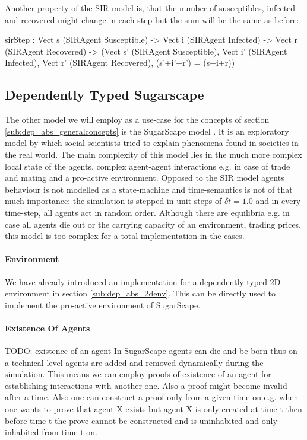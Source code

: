 Another property of the SIR model is, that the number of susceptibles, infected and recovered might change in each step but the sum will be the same as before:
\begin{HaskellCode}
sirStep : Vect s (SIRAgent Susceptible) -> 
          Vect i (SIRAgent Infected) ->
          Vect r (SIRAgent Recovered) -> 
          (Vect s' (SIRAgent Susceptible),
           Vect i' (SIRAgent Infected), 
           Vect r' (SIRAgent Recovered), (s'+i'+r') = (s+i+r))
\end{HaskellCode}
          
\subsection{Dependently Typed Sugarscape}
\label{sub:dep_abs_sugarscape}
The other model we will employ as a use-case for the concepts of section \ref{sub:dep_abs_generalconcepts} is the SugarScape model \cite{epstein_growing_1996}. It is an exploratory model by which social scientists tried to explain phenomena found in societies in the real world. The main complexity of this model lies in the much more complex local state of the agents, complex agent-agent interactions e.g. in case of trade and mating and a pro-active environment. Opposed to the SIR model agents behaviour is not modelled as a state-machine and time-semantics is not of that much importance: the simulation is stepped in unit-steps of $\delta t = 1.0$ and in every time-step, all agents act in random order. Although there are equilibria e.g. in case all agents die out or the carrying capacity of an environment, trading prices, this model is too complex for a total implementation in the cases.

\paragraph{Environment}
We have already introduced an implementation for a dependently typed 2D environment in section \ref{sub:dep_abs_2denv}. This can be directly used to implement the pro-active environment of SugarScape.

\paragraph{Existence Of Agents}
TODO: existence of an agent
In SugarScape agents can die and be born thus on a technical level agents are added and removed dynamically during the simulation. This means we can employ proofs of existence of an agent for establishing interactions with another one. Also a proof might become invalid after a time. Also one can construct a proof only from a given time on e.g. when one wants to prove that agent X exists but agent X is only created at time t then before time t the prove cannot be constructed and is uninhabited and only inhabited from time t on.

